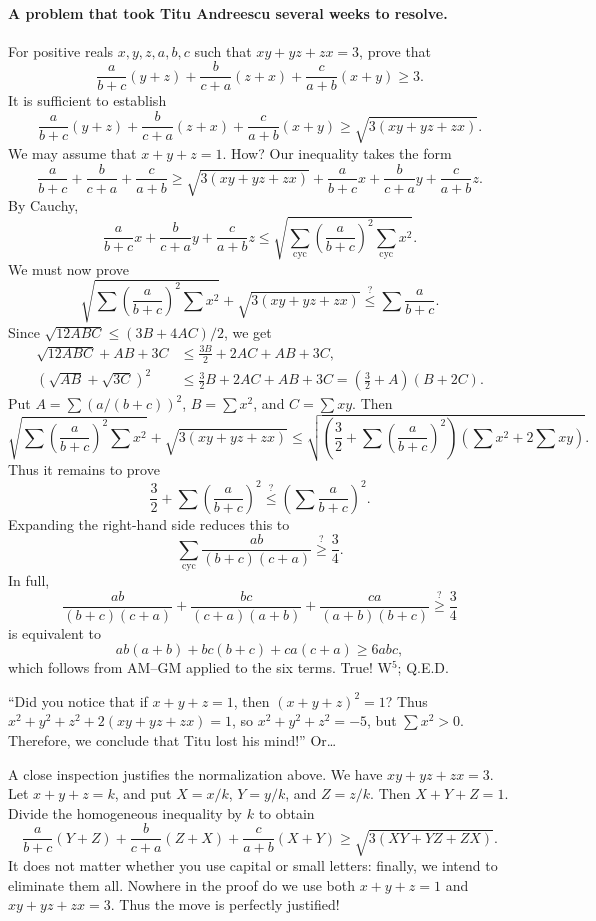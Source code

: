 \documentclass[11pt,a4paper]{article}
\begin{document}
\paragraph{A problem that took Titu Andreescu several weeks to resolve.}
For positive reals $x,y,z,a,b,c$ such that $xy+yz+zx=3$, prove that
\[\frac a{b+c}(y+z)+\frac b{c+a}(z+x)+\frac c{a+b}(x+y)\geq3.\]
It is sufficient to establish
\[\frac a{b+c}(y+z)+\frac b{c+a}(z+x)+\frac c{a+b}(x+y)
\geq\sqrt{3(xy+yz+zx)}.\]
We may assume that $x+y+z=1$. How?
Our inequality takes the form
\[\frac a{b+c}+\frac b{c+a}+\frac c{a+b}
\geq\sqrt{3(xy+yz+zx)}+\frac a{b+c}x+\frac b{c+a}y+\frac c{a+b}z.\]
By Cauchy,
\[\frac a{b+c}x+\frac b{c+a}y+\frac c{a+b}z
\leq\sqrt{\sum_{\mathrm{cyc}}\left(\frac a{b+c}\right)^2
\sum_{\mathrm{cyc}}x^2}.\]
We must now prove
\[\sqrt{\sum\left(\frac a{b+c}\right)^2\sum x^2}
+\sqrt{3(xy+yz+zx)}
\mathrel{\stackrel{?}{\leq}}\sum\frac a{b+c}.\]
Since $\sqrt{12ABC}\leq(3B+4AC)/2$, we get
\[
\begin{aligned}
\sqrt{12ABC}+AB+3C&\leq\frac{3B}{2}+2AC+AB+3C,\\
(\sqrt{AB}+\sqrt{3C})^2&\leq\frac32B+2AC+AB+3C
=\left(\frac32+A\right)(B+2C).
\end{aligned}
\]
Put $A=\sum(a/(b+c))^2$, $B=\sum x^2$, and $C=\sum xy$. Then
\[
\sqrt{\sum\left(\frac a{b+c}\right)^2\sum x^2}+\sqrt{3(xy+yz+zx)}
\leq\sqrt{\left(\frac32+\sum\left(\frac a{b+c}\right)^2\right)
\left(\sum x^2+2\sum xy\right)}.
\]
Thus it remains to prove
\[
\frac32+\sum\left(\frac a{b+c}\right)^2
\mathrel{\stackrel{?}{\leq}}\left(\sum\frac a{b+c}\right)^2.
\]
Expanding the right-hand side reduces this to
\[\sum_{\mathrm{cyc}}\frac{ab}{(b+c)(c+a)}\mathrel{\stackrel{?}{\geq}}\frac34.\]
In full,
\[
\frac{ab}{(b+c)(c+a)}+\frac{bc}{(c+a)(a+b)}+\frac{ca}{(a+b)(b+c)}
\mathrel{\stackrel{?}{\geq}}\frac34
\]
is equivalent to
\[
ab(a+b)+bc(b+c)+ca(c+a)\geq6abc,
\]
which follows from AM--GM applied to the six terms. True! W$^5$; Q.E.D.

``Did you notice that if $x+y+z=1$, then $(x+y+z)^2=1$?
Thus $x^2+y^2+z^2+2(xy+yz+zx)=1$, so
$x^2+y^2+z^2=-5$, but $\sum x^2>0$.
Therefore, we conclude that Titu lost his mind!'' Or\ldots

A close inspection justifies the normalization above.
We have $xy+yz+zx=3$. Let $x+y+z=k$, and put
$X=x/k$, $Y=y/k$, and $Z=z/k$. Then $X+Y+Z=1$.
Divide the homogeneous inequality by $k$ to obtain
\[
\frac a{b+c}(Y+Z)+\frac b{c+a}(Z+X)+\frac c{a+b}(X+Y)
\geq\sqrt{3(XY+YZ+ZX)}.
\]
It does not matter whether you use capital or small letters: finally, we intend to eliminate them all.
Nowhere in the proof do we use both $x+y+z=1$ and $xy+yz+zx=3$.
Thus the move is perfectly justified!
\end{document}
